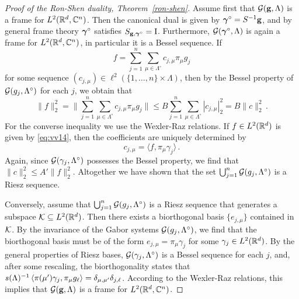 \documentclass[12pt]{amsart}
\begin{document}
  
\begin{proof}[Proof of the Ron-Shen duality, Theorem~\ref{ron-shen}]
Assume first that  $\mathcal{G} (\mathbf{g}, \Lambda )$ is a frame for 
$L^2(\mathbb{R}^d, \mathbb{C} ^n)$. Then the
canonical dual is given by $\boldsymbol{\gamma} ^\circ  = S^{-1} \mathbf{g}$, and by
general frame theory $\boldsymbol{\gamma}  ^\circ $ satisfies $S_{\mathbf{g},
 \boldsymbol{\gamma} ^\circ} = \mathrm{I}$. Furthermore, $\mathcal{G} (\boldsymbol{\gamma} ^\circ ,
\Lambda )$ is again a frame for %
$L^2(\mathbb{R}^d, \mathbb{C}^n)$,  in particular it is a Bessel
sequence. If 
\begin{equation}
  \label{eq:vv14}
  f= \sum _{j=1}^n \sum _{\mu \in  \Lambda ^\circ }
c_{j,\mu  } \pi _\mu g_j
\end{equation} for some sequence $(c_{j,\mu })
\in \ell ^2(\{1, \dots , n\}\times \Lambda )$, %
then by
the Bessel property of $\mathcal{G} (g_j, \Lambda ^\circ)$ for each $j$, we obtain 
that 
$$
\|f \|_2^2 = \|\sum _{j=1}^n \sum _{\mu \in \Lambda ^\circ }
c_{j,\mu } \pi _\mu g_j \| \leq  B \sum _{j=1} ^n \sum
_{\mu  \in \Lambda ^\circ } |c_{j,\mu }|^2_2 = B \|c\|_2^2 \, .
$$
For the converse inequality we use the Wexler-Raz relations. If $f \in
L^2(\mathbb{R} ^d ) $ is given by \eqref{eq:vv14}, then the coefficients are uniquely
determined by 
$$
c_{j,\mu } = \langle f, \pi _\mu \gamma _j \rangle  \, .
$$
Again, since $\mathcal{G} (\gamma _j, \Lambda ^\circ )$ possesses the Bessel
property, we find that $\|c\|_2^2 \leq A' \|f\|_2^2$. Altogether we
have shown that the set $\bigcup _{j=1}^n \mathcal{G} (g_j , \Lambda ^\circ )$ is
a Riesz sequence. 

Conversely, assume that  $\bigcup _{j=1}^n \mathcal{G} (g_j , \Lambda ^\circ )$
is a Riesz sequence that generates a subspace $\mathcal{K} \subseteq L^2(\mathbb{R} ^d )
$. Then there exists a biorthogonal basis $\{e_{j,\mu }\}$ contained
in $\mathcal{K}$. By the invariance of the Gabor systems $\mathcal{G} (g_j, \Lambda
^\circ)$, we find that the biorthogonal basis must be of the form
$e_{j,\mu } = \pi _\mu \gamma _j$ for some $\gamma _j \in L^2(\mathbb{R} ^d ) $. By
the general properties of Riesz bases, $\mathcal{G} (\gamma _j, \Lambda ^\circ
)$ is a Bessel sequence for each $j$, and, after some rescaling, the biorthogonality states
that $s(\Lambda )^{-1} \, \langle \pi (\mu ')\gamma _j, \pi _\mu g _\ell \rangle =
\delta _{\mu,\mu '} \delta _{j,\ell }$. According to the Wexler-Raz
relations, this implies that $\mathcal{G} (\mathbf{g}, \Lambda )$ is a frame
for $L^2(\mathbb{R} ^d, \mathbb{C} ^n) $. 
\end{proof}

 


%  
\end{document}
